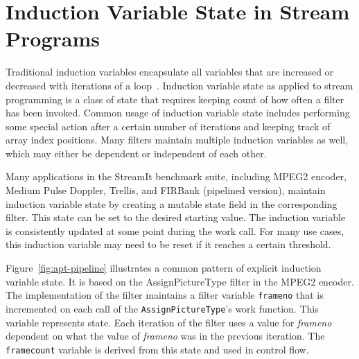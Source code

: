 \section{Induction Variable State in Stream Programs}
\label{sec:inductionstate}

  




Traditional induction variables encapsulate all variables that are
increased or decreased with iterations of a loop~\cite{Aho:1986, Fischer:2009}.  Induction variable
state as applied to stream programming is a class of state that
requires keeping count of how often a filter has been invoked.  Common
usage of induction variable state includes performing some special
action after a certain number of iterations and keeping track of array
index positions.  Many filters maintain multiple induction variables
as well, which may either be dependent or independent of each other.

Many applications in the StreamIt benchmark suite, including MPEG2 encoder,
Medium Pulse Doppler, Trellis, and FIRBank (pipelined version), maintain induction variable state 
by creating a mutable state field in the corresponding filter.  This
state can be set to the desired starting value.  The induction
variable is consistently updated at some point during the work call.
For many use cases, this induction variable may need to be reset if it
reaches a certain threshold. 

Figure~\ref{fig:apt-pipeline} illustrates a common pattern of explicit
induction variable state.  It is based on the AssignPictureType filter in 
the MPEG2 encoder. The implementation of the filter maintains
a filter variable {\tt frameno} that is incremented on each call of
the {\tt AssignPictureType}'s work function.  This variable
represents state.  Each iteration of the 
filter uses a value for {\it frameno} dependent on what the value of
{\it frameno} was in the previous iteration.  The {\tt framecount} variable is derived
from this state and used in control flow.

